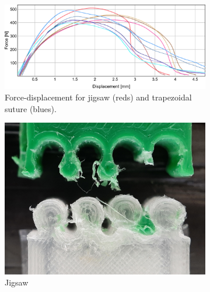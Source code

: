 \begin{figure}
	\centering
	\begin{subfigure}[B]{.79\columnwidth}
		\centering
		\includegraphics[width=\columnwidth]{sources/testing/force_displacement_jigsaw_and_suture.png}
		\caption{Force-displacement for jigsaw (reds) and trapezoidal suture (blues).}
		\label{fig:force-displacement_dovetail}
	\end{subfigure}
\setlength{\figwidth}{.19\columnwidth}
	\begin{minipage}[b]{\figwidth}\centering
		\begin{subfigure}[B]{\figwidth}
			\centering
			\includegraphics{sources/testing/jigsaw_cropped.jpg}
			\caption{Jigsaw}
			\label{fig:failures_jigsaw}
		\end{subfigure}
		\begin{subfigure}[B]{\figwidth}
			\centering

\end{subfigure}
\end{minipage}
\end{figure}
